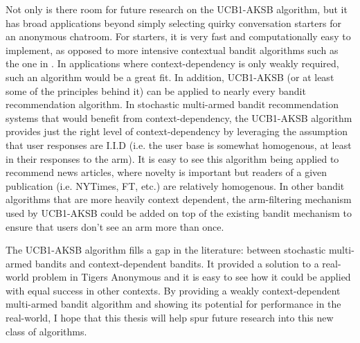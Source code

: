 Not only is there room for future research on the UCB1-AKSB algorithm, but it has broad applications beyond simply selecting quirky conversation starters for an anonymous chatroom. For starters, it is very fast and computationally easy to implement, as opposed to more intensive contextual bandit algorithms such as the one in \citet{chu10}. In applications where context-dependency is only weakly required, such an algorithm would be a great fit. In addition, UCB1-AKSB (or at least some of the principles behind it) can be applied to nearly every bandit recommendation algorithm. In stochastic multi-armed bandit recommendation systems that would benefit from context-dependency, the UCB1-AKSB algorithm provides just the right level of context-dependency by leveraging the assumption that user responses are I.I.D (i.e. the user base is somewhat homogenous, at least in their responses to the arm). It is easy to see this algorithm being applied to recommend news articles, where novelty is important but readers of a given publication (i.e. NYTimes, FT, etc.) are relatively homogenous. In other bandit algorithms that are more heavily context dependent, the arm-filtering mechanism used by UCB1-AKSB could be added on top of the existing bandit mechanism to ensure that users don't see an arm more than once. 

The UCB1-AKSB algorithm fills a gap in the literature: between stochastic multi-armed bandits and context-dependent bandits. It provided a solution to a real-world problem in Tigers Anonymous and it is easy to see how it could be applied with equal success in other contexts. By providing a weakly context-dependent multi-armed bandit algorithm and showing its potential for performance in the real-world, I hope that this thesis will help spur future research into this new class of algorithms.

